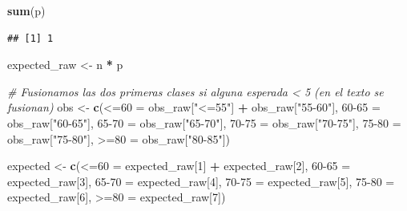 \documentclass[
]{article}
\newenvironment{Shaded}{\begin{snugshade}}{\end{snugshade}}
\newcommand{\AttributeTok}[1]{\textcolor[rgb]{0.13,0.29,0.53}{#1}}
\newcommand{\CommentTok}[1]{\textcolor[rgb]{0.56,0.35,0.01}{\textit{#1}}}
\newcommand{\DecValTok}[1]{\textcolor[rgb]{0.00,0.00,0.81}{#1}}
\newcommand{\FunctionTok}[1]{\textcolor[rgb]{0.13,0.29,0.53}{\textbf{#1}}}
\newcommand{\NormalTok}[1]{#1}
\newcommand{\OtherTok}[1]{\textcolor[rgb]{0.56,0.35,0.01}{#1}}
\newcommand{\SpecialCharTok}[1]{\textcolor[rgb]{0.81,0.36,0.00}{\textbf{#1}}}
\newcommand{\StringTok}[1]{\textcolor[rgb]{0.31,0.60,0.02}{#1}}
\begin{document}
\begin{Shaded}
\begin{Highlighting}[]
\FunctionTok{sum}\NormalTok{(p)}
\end{Highlighting}
\end{Shaded}

\begin{verbatim}
## [1] 1
\end{verbatim}

\begin{Shaded}
\begin{Highlighting}[]
\NormalTok{expected\_raw }\OtherTok{\textless{}{-}}\NormalTok{ n }\SpecialCharTok{*}\NormalTok{ p}

\CommentTok{\# Fusionamos las dos primeras clases si alguna esperada \textless{} 5 (en el texto se fusionan)}
\NormalTok{obs }\OtherTok{\textless{}{-}} \FunctionTok{c}\NormalTok{(}\StringTok{\textasciigrave{}}\AttributeTok{\textless{}=60}\StringTok{\textasciigrave{}} \OtherTok{=}\NormalTok{ obs\_raw[}\StringTok{"\textless{}=55"}\NormalTok{] }\SpecialCharTok{+}\NormalTok{ obs\_raw[}\StringTok{"55{-}60"}\NormalTok{],}
         \StringTok{\textasciigrave{}}\AttributeTok{60{-}65}\StringTok{\textasciigrave{}} \OtherTok{=}\NormalTok{ obs\_raw[}\StringTok{"60{-}65"}\NormalTok{],}
         \StringTok{\textasciigrave{}}\AttributeTok{65{-}70}\StringTok{\textasciigrave{}} \OtherTok{=}\NormalTok{ obs\_raw[}\StringTok{"65{-}70"}\NormalTok{],}
         \StringTok{\textasciigrave{}}\AttributeTok{70{-}75}\StringTok{\textasciigrave{}} \OtherTok{=}\NormalTok{ obs\_raw[}\StringTok{"70{-}75"}\NormalTok{],}
         \StringTok{\textasciigrave{}}\AttributeTok{75{-}80}\StringTok{\textasciigrave{}} \OtherTok{=}\NormalTok{ obs\_raw[}\StringTok{"75{-}80"}\NormalTok{],}
         \StringTok{\textasciigrave{}}\AttributeTok{\textgreater{}=80}\StringTok{\textasciigrave{}}  \OtherTok{=}\NormalTok{ obs\_raw[}\StringTok{"80{-}85"}\NormalTok{])}

\NormalTok{expected }\OtherTok{\textless{}{-}} \FunctionTok{c}\NormalTok{(}\StringTok{\textasciigrave{}}\AttributeTok{\textless{}=60}\StringTok{\textasciigrave{}} \OtherTok{=}\NormalTok{ expected\_raw[}\DecValTok{1}\NormalTok{] }\SpecialCharTok{+}\NormalTok{ expected\_raw[}\DecValTok{2}\NormalTok{],}
              \StringTok{\textasciigrave{}}\AttributeTok{60{-}65}\StringTok{\textasciigrave{}} \OtherTok{=}\NormalTok{ expected\_raw[}\DecValTok{3}\NormalTok{],}
              \StringTok{\textasciigrave{}}\AttributeTok{65{-}70}\StringTok{\textasciigrave{}} \OtherTok{=}\NormalTok{ expected\_raw[}\DecValTok{4}\NormalTok{],}
              \StringTok{\textasciigrave{}}\AttributeTok{70{-}75}\StringTok{\textasciigrave{}} \OtherTok{=}\NormalTok{ expected\_raw[}\DecValTok{5}\NormalTok{],}
              \StringTok{\textasciigrave{}}\AttributeTok{75{-}80}\StringTok{\textasciigrave{}} \OtherTok{=}\NormalTok{ expected\_raw[}\DecValTok{6}\NormalTok{],}
              \StringTok{\textasciigrave{}}\AttributeTok{\textgreater{}=80}\StringTok{\textasciigrave{}}  \OtherTok{=}\NormalTok{ expected\_raw[}\DecValTok{7}\NormalTok{])}


\end{Highlighting}
\end{Shaded}
\end{document}
